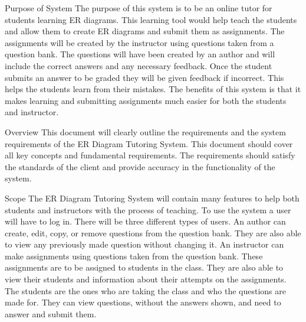 	\begin{chapter}{Purpose of System}
		The purpose of this system is to be an online tutor for students learning ER diagrams. 
		This learning tool would help teach the students and allow them to create ER diagrams and submit 
		them as assignments. The assignments will be created by the instructor using questions taken from 
		a question bank. The questions will have been created by an author and will include the correct answers 
		and any necessary feedback. Once the student submits an answer to be graded they will be given feedback 
		if incorrect. This helps the students learn from their mistakes. The benefits of this system is that it 
		makes learning and submitting assignments much easier for both the students and instructor.
	\end{chapter}

	\begin{chapter}{Overview}
		This document will clearly outline the requirements and the system requirements of the ER Diagram 
		Tutoring System. This document should cover all key concepts and fundamental requirements. 
		The requirements should satisfy the standards of the client and provide accuracy in the functionality 
		of the system.
	\end{chapter}

	\begin{chapter}{Scope}
		The ER Diagram Tutoring System will contain many features to help both students and instructors with 
		the process of teaching. To use the system a user will have to log in. There will be three different 
		types of users. An author can create, edit, copy, or remove questions from the question bank. 
		They are also able to view any previously made question without changing it. An instructor can 
		make assignments using questions taken from the question bank. These assignments are to be assigned 
		to students in the class. They are also able to view their students and information about their 
		attempts on the assignments. The students are the ones who are taking the class and who the questions 
		are made for. They can view questions, without the answers shown, and need to answer and submit them. 
	\end{chapter}


